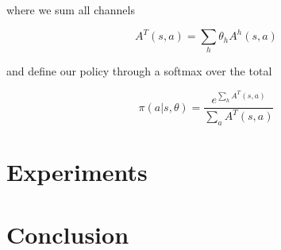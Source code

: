 \documentclass{article}
\begin{document}
where we sum all channels

\begin{equation}
  A^T(s,a) = \sum_h \theta_h A^h(s,a)
\end{equation}

and define our policy through a softmax over the total

\begin{equation}
  \pi(a|s, \theta) = \frac{e^{\sum_h A^T(s,a)}}{\sum_a A^T(s,a)}
\end{equation}

\section{Experiments}

\section{Conclusion}

% 
% 
\end{document}
